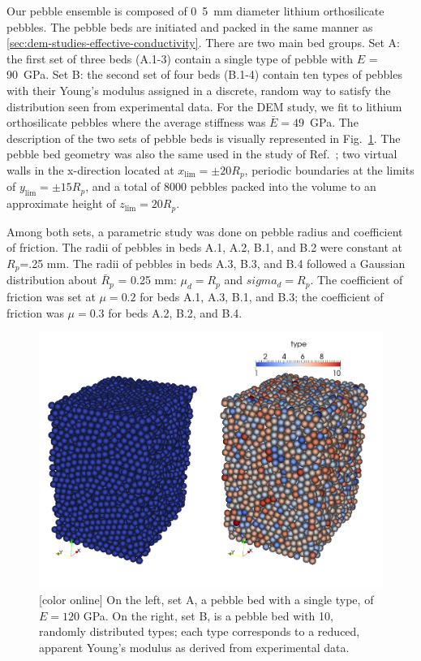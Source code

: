 Our pebble ensemble is composed of \si{0.5 mm} diameter lithium orthosilicate pebbles. The pebble beds are initiated and packed in the same manner as \cref{sec:dem-studies-effective-conductivity}. There are two main bed groups. Set A: the first set of three beds (A.1-3) contain a single type of pebble with $E$ = \si{90 GPa}. Set B: the second set of four beds (B.1-4) contain ten types of pebbles with their Young's modulus assigned in a discrete, random way to satisfy the distribution seen from experimental data. For the DEM study, we fit to lithium orthosilicate pebbles where the average stiffness was $\bar{E} = 49$~GPa. The description of the two sets of pebble beds is visually represented in Fig.~\ref{fig:dem-types}. The pebble bed geometry was also the same used in the study of Ref.~\cite{VanLew2014}; two virtual walls in the x-direction located at $x_\text{lim} = \pm 20 R_p$, periodic boundaries at the limits of $y_\text{lim} = \pm 15 R_p$, and a total of 8000 pebbles packed into the volume to an approximate height of $z_\text{lim} = 20 R_p$.

Among both sets, a parametric study was done on pebble radius and coefficient of friction. The radii of pebbles in beds A.1, A.2, B.1, and B.2 were constant at $R_p$=.25 mm. The radii of pebbles in beds A.3, B.3, and B.4 followed a Gaussian distribution about $\bar{R}_p$ = 0.25 mm: $\mu_d = R_p$ and $sigma_d = R_p$. The coefficient of friction was set at $\mu = 0.2$ for beds A.1, A.3, B.1, and B.3; the coefficient of friction was $\mu = 0.3$ for beds A.2, B.2, and B.4.


\begin{figure}[t]
  \centering
  \includegraphics[width = 0.75 \textwidth]{chapters/figures/DEM-types}
  \caption{[color online] On the left, set A, a pebble bed with a single type, of $E = 120$ GPa. On the right, set B, is a pebble bed with 10, randomly distributed types; each type corresponds to a reduced, apparent Young's modulus as derived from experimental data.}\label{fig:dem-types}
\end{figure}





